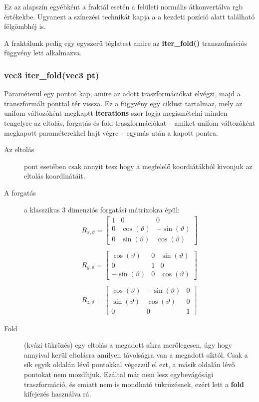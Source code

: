 Ez az alapszín egyébként a fraktál esetén a felületi normális átkonvertálva rgb értékekbe. Ugyanezt a színezési technikát kapja a a kezdeti pozíció alatt található félgömbhéj is. 

A fraktálunk pedig egy egyszerű téglatest amire az \textbf{iter\_fold()} transzofmációs függvény lett alkalmazva.

\subsubsection{vec3 iter\_fold(vec3 pt)}
Paraméterül egy pontot kap, amire az adott traszformációkat elvégzi, majd a transzformált ponttal tér vissza. Ez a függvény egy ciklust tartalmaz, mely az unifom változóként megkaptt \textbf{iterations}-szor fogja megismételni minden tengelyre az eltolás, forgatás és fold traszformációkat -- amiket unifom változóként megkapott paraméterekkel hajt végre -- egymás után a kapott pontra.

\begin{description}
	\item[Az eltolás] pont esetében csak annyit tesz hogy a megfelelő koordiátákból kivonjuk az eltolás koordinátáit.
	\item[A forgatás] a klasszikus 3 dimenziós forgatási mátrixokra épül:
$$\begin{array}{l}
R_{x, \vartheta}=\left[\begin{array}{ccc}
1 & 0 & 0 \\
0 & \cos (\vartheta) & -\sin (\vartheta) \\
0 & \sin (\vartheta) & \cos (\vartheta)
\end{array}\right] \\
\\
R_{y, \vartheta}=\left[\begin{array}{ccc}
\cos (\vartheta) & 0 & \sin (\vartheta) \\
0 & 1 & 0 \\
-\sin (\vartheta) & 0 & \cos (\vartheta)
\end{array}\right] \\
\\
R_{z, \vartheta}=\left[\begin{array}{ccc}
\cos (\vartheta) & -\sin (\vartheta) & 0 \\
\sin (\vartheta) & \cos (\vartheta) & 0 \\
0 & 0 & 1
\end{array}\right]
\end{array}$$
	\item[Fold] (kvázi tükrözés) egy eltolás a megadott síkra merőlegesen, úgy hogy annyival kerül eltolásra amilyen távolságra van a megadott síktól. Csak a sík egyik oldalán lévő pontokkal végezzül el ezt, a másik oldalán lévő pontokat nem mozdítjuk. Ezáltal már nem lesz egybevágósági traszformáció, és emiatt nem is mondható tükrözésnek, ezért lett a \textbf{fold} kifejezés használva rá.
\end{description}

